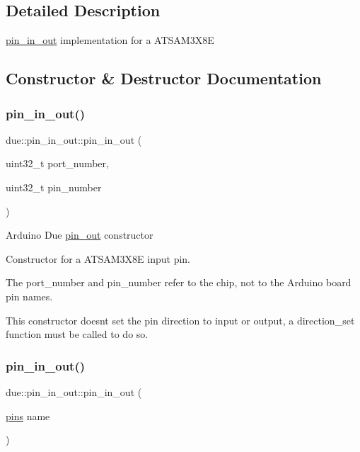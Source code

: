 \subsection{Detailed Description}
\hyperlink{classdue_1_1pin__in__out}{pin\+\_\+in\+\_\+out} implementation for a A\+T\+S\+A\+M3\+X8E 

\subsection{Constructor \& Destructor Documentation}
\mbox{\label{classdue_1_1pin__in__out_a1673814fdfa3f4c152be2b5aa08974cd}} 
\subsubsection{\texorpdfstring{pin\+\_\+in\+\_\+out()}{pin\_in\_out()}\hspace{0.1cm}{\footnotesize\ttfamily [1/2]}}
{\footnotesize\ttfamily due\+::pin\+\_\+in\+\_\+out\+::pin\+\_\+in\+\_\+out (\begin{DoxyParamCaption}\item[{uint32\+\_\+t}]{port\+\_\+number,  }\item[{uint32\+\_\+t}]{pin\+\_\+number }\end{DoxyParamCaption})\hspace{0.3cm}{\ttfamily [inline]}}

Arduino Due \hyperlink{classdue_1_1pin__out}{pin\+\_\+out} constructor

Constructor for a A\+T\+S\+A\+M3\+X8E input pin.

The port\+\_\+number and pin\+\_\+number refer to the chip, not to the Arduino board pin names.

This constructor doesn\textquotesingle{}t set the pin direction to input or output, a direction\+\_\+set function must be called to do so. \mbox{\label{classdue_1_1pin__in__out_a228da28eb609b180235db2a0ed249469}} 
\subsubsection{\texorpdfstring{pin\+\_\+in\+\_\+out()}{pin\_in\_out()}\hspace{0.1cm}{\footnotesize\ttfamily [2/2]}}
{\footnotesize\ttfamily due\+::pin\+\_\+in\+\_\+out\+::pin\+\_\+in\+\_\+out (\begin{DoxyParamCaption}\item[{\hyperlink{namespacedue_a8ffa3ec309934ff9db34317e504bcc92}{pins}}]{name }\end{DoxyParamCaption})\hspace{0.3cm}{\ttfamily [inline]}}

